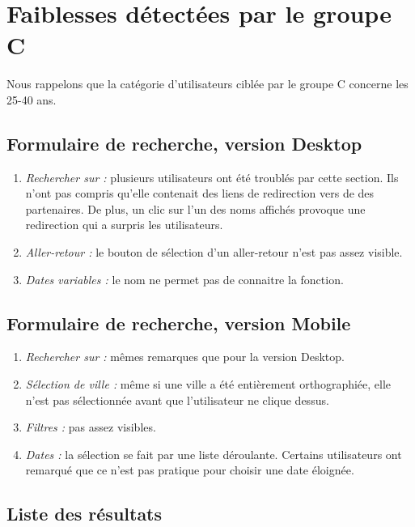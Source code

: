 
\section{Faiblesses d\'{e}tect\'{e}es par le groupe C}

Nous rappelons que la cat\'{e}gorie d'utilisateurs cibl\'{e}e par le groupe C
concerne les 25-40 ans.




\subsection{Formulaire de recherche, version Desktop}
\begin{enumerate}
\item {\em Rechercher sur : } plusieurs utilisateurs ont \'{e}t\'{e} troubl\'{e}s par cette section. Ils n'ont pas compris qu'elle contenait des liens de redirection vers de des partenaires. De plus, un clic sur l'un des noms affich\'{e}s provoque une redirection qui a surpris les utilisateurs.
\item {\em Aller-retour : } le bouton de s\'{e}lection d'un aller-retour n'est pas assez visible.
\item {\em Dates variables : } le nom ne permet pas de connaitre la fonction.
\end{enumerate}

\subsection{Formulaire de recherche, version Mobile}

\begin{enumerate}
\item {\em Rechercher sur : } m\^{e}mes remarques que pour la version Desktop.
\item {\em S\'{e}lection de ville : } m\^{e}me si une ville a \'{e}t\'{e} enti\`{e}rement orthographi\'{e}e, elle n'est pas s\'{e}lectionn\'{e}e avant que l'utilisateur ne clique dessus.
\item {\em Filtres : } pas assez visibles.
\item {\em Dates : } la s\'{e}lection se fait par une liste d\'{e}roulante. Certains utilisateurs ont remarqu\'{e} que ce n'est pas pratique pour choisir une date \'{e}loign\'{e}e.
\end{enumerate}

\subsection{Liste des r\'{e}sultats}

